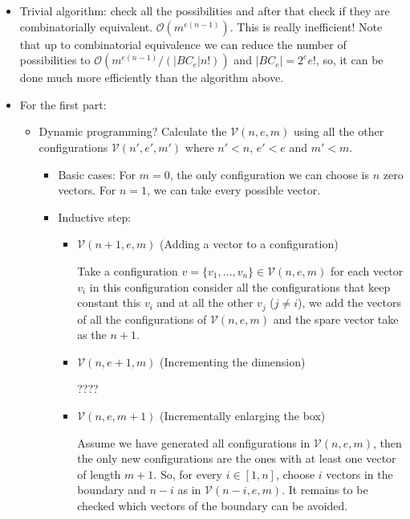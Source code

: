 \documentclass[11pt]{article}
\begin{document}
\begin{itemize}
  \item Trivial algorithm: check all the possibilities and after that check if they are combinatorially equivalent. $\mathcal{O}(m^{e(n-1)})$. This is really inefficient! Note that up to combinatorial equivalence we can reduce the number of possibilities to $\mathcal{O}(m^{e(n-1)}/(|BC_e|n!))$ and $|BC_e| = 2^e e!$, so, it can be done much more efficiently than the algorithm above.
  \item For the first part:
  
  \begin{itemize}
    \item Dynamic programming? Calculate the $\mathcal{V}(n,e,m)$ using all the other configurations $\mathcal{V}(n',e',m')$ where $n'<n$, $e'<e$ and $m'<m$.
    
    \begin{itemize}
      \item Basic cases: For $m=0$, the only configuration we can choose is $n$ zero vectors. For $n=1$, we can take every possible vector.
      \item Inductive step:
      
      \begin{itemize}
        \item $\mathcal{V}(n + 1,e,m)$ (Adding a vector to a configuration)
        
        Take a configuration $v = \{v_1, \ldots, v_n\}\in \mathcal{V}(n,e,m)$ for each vector $v_i$ in this configuration consider all the configurations that keep constant this $v_i$ and at all the other $v_j$ ($j \neq i$), we add the vectors of all the configurations of $\mathcal{V}(n,e,m)$ and the spare vector take as the $n+1$.
        
        \item $\mathcal{V}(n,e + 1,m)$ (Incrementing the dimension)
        
        ????
        
        \item $\mathcal{V}(n,e,m + 1)$ (Incrementally enlarging the box)
        
        Assume we have generated all configurations in $\mathcal{V}(n,e,m)$, then the only new configurations are the ones with at least one vector of length $m+1$. So, for every $i \in [1,n]$, choose $i$ vectors in the boundary and $n-i$ as in $\mathcal{V}(n-i,e,m)$. It remains to be checked which vectors of the boundary can be avoided.
      \end{itemize}
    \end{itemize}
  \end{itemize}
  

\end{itemize}
\end{document}
